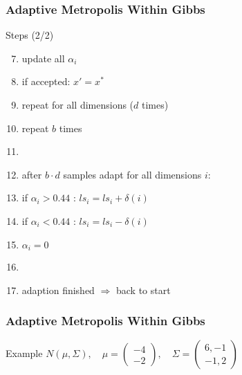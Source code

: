 \begin{frame}
\frametitle{Adaptive Metropolis Within Gibbs}
\begin{block}{Steps (2/2)}
\begin{enumerate}
\setcounter{enumi}{6}
\item update all $\alpha_i$
\item if accepted: $x' = x^*$
\item repeat for all dimensions ($d$ times)
\item repeat $b$ times
\item[]
\item after $b\cdot d$ samples adapt for all dimensions $i$:
\item if $\alpha_i > 0.44$ : $ls_i = ls_i + \delta(i)$
\item if $\alpha_i < 0.44$ : $ls_i = ls_i - \delta(i)$
\item $\alpha_i = 0$
\item []
\item adaption finished $\Rightarrow$ back to start
\end{enumerate}
\end{block}
\end{frame}

\begin{frame}
\frametitle{Adaptive Metropolis Within Gibbs}
\begin{block}{Example}
$N(\mu, \Sigma), \quad \mu = \begin{pmatrix} -4 \\ -2
\end{pmatrix} , \quad \Sigma = \begin{pmatrix} 6,-1 \\ -1,2
\end{pmatrix}$
\end{block}
\end{frame}